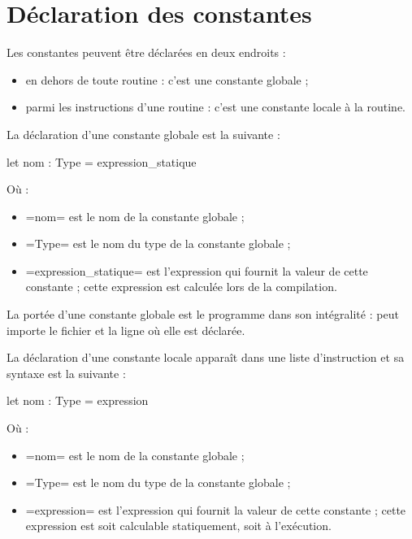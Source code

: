 




\chapter{Déclaration des constantes}

Les constantes peuvent être déclarées en deux endroits :
\begin{itemize}
  \item en dehors de toute routine : c'est une constante globale ;
  \item parmi les instructions d'une routine : c'est une constante locale à la routine.
\end{itemize}





La déclaration d'une constante globale est la suivante :

\begin{PLM}
let nom : Type = expression_statique
\end{PLM}

Où :
\begin{itemize}
  \item \plm=nom= est le nom de la constante globale ;
  \item \plm=Type= est le nom du type de la constante globale ;
  \item \plm=expression_statique= est l'expression qui fournit la valeur de cette constante ; cette expression est calculée lors de la compilation.
\end{itemize}

La portée d'une constante globale est le programme dans son intégralité : peut importe le fichier et la ligne où elle est déclarée.





La déclaration d'une constante locale apparaît dans une liste d'instruction et sa syntaxe est la suivante :

\begin{PLM}
let nom : Type = expression
\end{PLM}

Où :
\begin{itemize}
  \item \plm=nom= est le nom de la constante globale ;
  \item \plm=Type= est le nom du type de la constante globale ;
  \item \plm=expression= est l'expression qui fournit la valeur de cette constante ; cette expression est soit calculable statiquement, soit à l'exécution.
\end{itemize}
